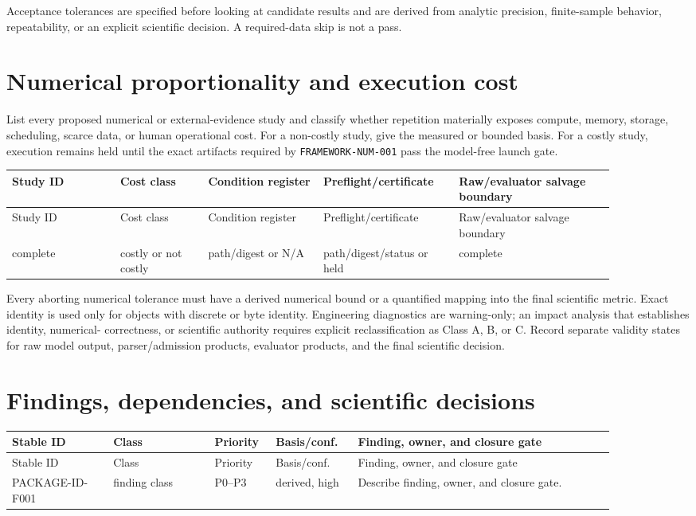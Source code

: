 \documentclass[11pt]{article}
\newcommand{\code}[1]{\nolinkurl{#1}}
\newcommand{\AuditPackageID}{PACKAGE-ID}
\begin{document}
Acceptance tolerances are specified before looking at candidate results and
are derived from analytic precision, finite-sample behavior, repeatability,
or an explicit scientific decision. A required-data skip is not a pass.

\section{Numerical proportionality and execution cost}

List every proposed numerical or external-evidence study and classify whether
repetition materially exposes compute, memory, storage, scheduling, scarce
data, or human operational cost. For a non-costly study, give the measured or
bounded basis. For a costly study, execution remains held until the exact
artifacts required by \code{FRAMEWORK-NUM-001} pass the model-free launch gate.

\begin{longtable}{L{0.16\linewidth}L{0.13\linewidth}L{0.17\linewidth}L{0.19\linewidth}L{0.23\linewidth}}
\toprule
Study ID & Cost class & Condition register & Preflight/certificate & Raw/evaluator salvage boundary\\
\midrule
\endfirsthead
\toprule
Study ID & Cost class & Condition register & Preflight/certificate & Raw/evaluator salvage boundary\\
\midrule
\endhead
complete & costly or not costly & path/digest or N/A & path/digest/status or held & complete\\
\bottomrule
\end{longtable}

Every aborting numerical tolerance must have a derived numerical bound or a
quantified mapping into the final scientific metric. Exact identity is used
only for objects with discrete or byte identity. Engineering diagnostics are
warning-only; an impact analysis that establishes identity, numerical-
correctness, or scientific authority requires explicit reclassification as
Class A, B, or C. Record separate validity states for raw model output,
parser/admission products, evaluator products, and the final scientific
decision.

\section{Findings, dependencies, and scientific decisions}

\begin{longtable}{L{0.15\linewidth}L{0.15\linewidth}L{0.08\linewidth}L{0.12\linewidth}L{0.38\linewidth}}
\toprule
Stable ID & Class & Priority & Basis/conf. & Finding, owner, and closure gate\\
\midrule
\endfirsthead
\toprule
Stable ID & Class & Priority & Basis/conf. & Finding, owner, and closure gate\\
\midrule
\endhead
\AuditPackageID-F001 & finding class & P0--P3 & derived, high & Describe finding,
owner, and closure gate.\\
\bottomrule
\end{longtable}
\end{document}
